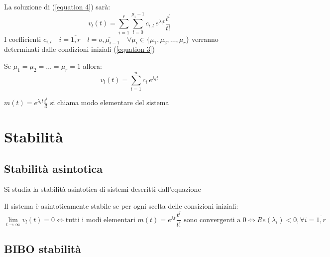 La soluzione di (\ref{equation 4}) sarà:
\begin{equation}
	v_l(t)=  \sum_{i=1}^{r}\sum_{l=0}^{\mu_i-1}c_{i,l} \,e^{\lambda_it}\frac{t^l}{t!}
	\tag{6}\label{equation 6}
\end{equation}
I coefficienti $c_{i,l}
	\quad i=\overline{1,r} 
	\quad l=\overline{o,\mu_{i-1}}
	\quad \forall\mu_i \in \{\mu_1,\mu_2,\dots,\mu_r\} $ 
	verranno determinati dalle condizioni iniziali (\ref{equation 3})
	
\begin{oss}
	Se $\mu_1 = \mu_2 = \dots = \mu_r = 1$ allora:
	\begin{equation}
		v_l(t)=  \sum_{i=1}^{n}c_{i} \,e^{\lambda_it}
	\end{equation}
\end{oss}

\begin{definition}
	$m(t) = e^{\lambda_i t} \frac{t^l}{l!} $ si chiama modo elementare del sistema
\end{definition}


\section{Stabilità}
\subsection{Stabilità asintotica}
Si studia la stabilità asintotica di sistemi descritti dall'equazione %

\begin{theorem}
	Il sistema %
	è asintoticamente stabile se per ogni scelta delle consizioni iniziali:
	\begin{equation*}
		\lim_{t \to \infty}v_l(t)=0
		\Leftrightarrow\text{tutti i modi elementari } m(t)=e^{\lambda t}\frac{t^l}{t!}\text{ sono convergenti a $0$}
		\Leftrightarrow Re(\lambda_i)<0,\forall i = \overline{1,r}
	\end{equation*}
\end{theorem}


\subsection{BIBO stabilità}


